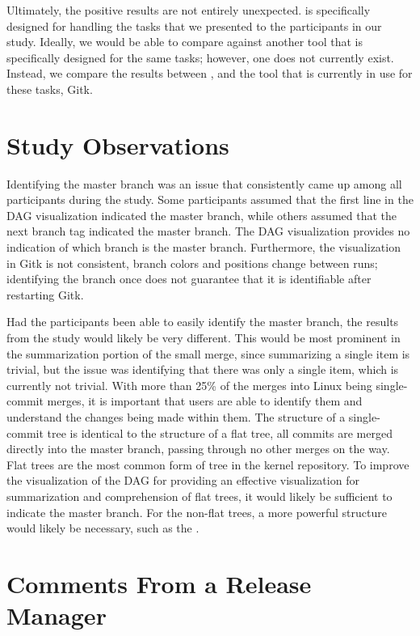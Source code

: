 Ultimately, the positive results are not entirely unexpected.
\tool{} is specifically designed for handling the tasks that we
presented to the participants in our study.
Ideally, we would be able to compare against another tool that is
specifically designed for the same tasks; however, one does not
currently exist.
Instead, we compare the results between \tool{}, and the tool that is
currently in use for these tasks, Gitk.

\section{Study Observations}\label{sec:study_observations}

Identifying the master branch was an issue that consistently came up
among all participants during the study. Some participants assumed that
the first line in the DAG visualization indicated the master branch,
while others assumed that the next branch tag indicated the master
branch. The DAG visualization provides no indication of which branch is
the master branch. Furthermore, the visualization in Gitk is not
consistent, branch colors and positions change between runs; identifying
the branch once does not guarantee that it is identifiable after
restarting Gitk.

Had the participants been able to easily identify the master branch, the
results from the study would likely be very different. This would be
most prominent in the summarization portion of the small merge, since
summarizing a single item is trivial, but the issue was identifying that
there was only a single item, which is currently not trivial. With more
than 25\% of the merges into Linux being single-commit merges, it is
important that users are able to identify them and understand the
changes being made within them. The structure of a single-commit tree is
identical to the structure of a flat tree, all commits are merged
directly into the master branch, passing through no other merges on the
way. Flat trees are the most common form of tree in the kernel
repository. To improve the visualization of the DAG for providing an
effective visualization for summarization and comprehension of flat
trees, it would likely be sufficient to indicate the master branch.
For the non-flat trees, a more powerful structure would likely be
necessary, such as the \mt{}.

\section{Comments From a Release Manager}\label{sec:comments_from_a_release_manager}

